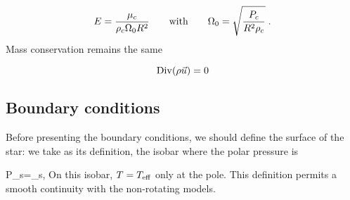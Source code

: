\begin{equation} E = \frac{\mu_c}{\rho_c \Omega_0 R^2} {\qquad {\rm with}\qquad}
\Omega_0=\sqrt{\frac{P_c}{R^2\rho_c}}\; .\end{equation}
Mass conservation remains the same

\begin{equation} \displaystyle {\rm Div}(\rho\vec{u}) =0\end{equation}

\subsection{Boundary conditions}

Before presenting the boundary conditions, we should define the surface
of the star: we take as its definition, the isobar where the polar
pressure is 

\beq P_s=\tau_s,\eeq
On this isobar, $T=T_{\rm eff}$ only at the pole. This definition
permits a smooth continuity with the non-rotating models.

